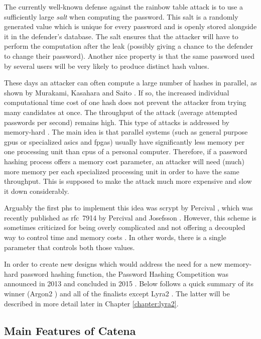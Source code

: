 The currently well-known defense against the rainbow table attack is to use a sufficiently large \emph{salt} when computing the password. This salt is a randomly generated value which is unique for every password and is openly stored alongside it in the defender's database. The salt ensures that the attacker will have to perform the computation after the leak (possibly giving a chance to the defender to change their password). Another nice property is that the same password used by several users will be very likely to produce distinct hash values.

These days an attacker can often compute a large number of hashes in parallel, as shown by Murakami, Kasahara and Saito \cite{5665047}. If so, the increased individual computational time cost of one hash does not prevent the attacker from trying many candidates at once. The throughput of the attack (average attempted passwords per second) remains high. This type of attacks is addressed by memory-hard . The main idea is that parallel systems (such as general purpose \glspl{gpu} or specialized \glspl{asic} and \glspl{fpga}) usually have significantly less memory per one processing unit than \glspl{cpu} of a personal computer. Therefore, if a password hashing process offers a memory cost parameter, an attacker will need (much) more memory per each specialized processing unit in order to have the same throughput. This is supposed to make the attack much more expensive and slow it down considerably.

Arguably the first \gls{phs} to implement this idea was scrypt by Percival \cite{percival:2016:scrypt}, which was recently published as \mbox{\gls{rfc} 7914} by Percival and Josefsson \cite{rfc7914}. However, this scheme is sometimes criticized for being overly complicated and not offering a decoupled way to control time and memory costs \cite{marcos:2015:lyra2}. In other words, there is a single parameter that controls both those values.

In order to create new designs which would address the need for a new memory-hard password hashing function, the Password Hashing Competition was announced in 2013 and concluded in 2015 \cite{wetzels:2016:phc}. Below follows a quick summary of its winner (Argon2 \cite{biryukov:2015:argon2}) and all of the finalists except Lyra2 \cite{andrade:2016:lyra2}. The latter will be described in more detail later in Chapter \ref{chapter:lyra2}.

\subsection{Main Features of Catena}
\label{sec:catena}

